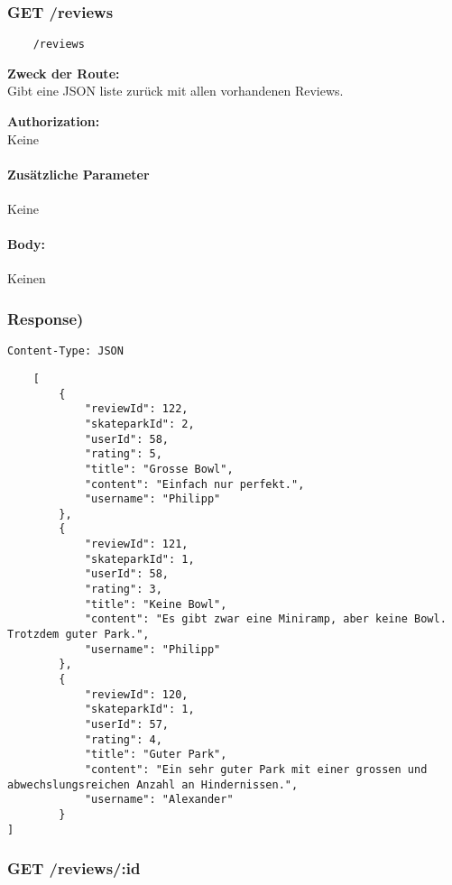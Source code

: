 \label{/reviews}

\subsubsection{GET /reviews}

\begin{lstlisting}
    /reviews
\end{lstlisting}

\textbf{Zweck der Route:} \\
Gibt  eine JSON liste zurück mit allen vorhandenen Reviews.

\textbf{Authorization:} \\
Keine

\paragraph{Zusätzliche Parameter}
Keine

\paragraph{Body:}

Keinen

\subsubsection{Response)}

\lstinline{Content-Type: JSON}
\begin{lstlisting}
    [
        {
            "reviewId": 122,
            "skateparkId": 2,
            "userId": 58,
            "rating": 5,
            "title": "Grosse Bowl",
            "content": "Einfach nur perfekt.",
            "username": "Philipp"
        },
        {
            "reviewId": 121,
            "skateparkId": 1,
            "userId": 58,
            "rating": 3,
            "title": "Keine Bowl",
            "content": "Es gibt zwar eine Miniramp, aber keine Bowl. Trotzdem guter Park.",
            "username": "Philipp"
        },
        {
            "reviewId": 120,
            "skateparkId": 1,
            "userId": 57,
            "rating": 4,
            "title": "Guter Park",
            "content": "Ein sehr guter Park mit einer grossen und abwechslungsreichen Anzahl an Hindernissen.",
            "username": "Alexander"
        }
]
\end{lstlisting}

\pagebreak

\subsubsection{GET /reviews/:id}

